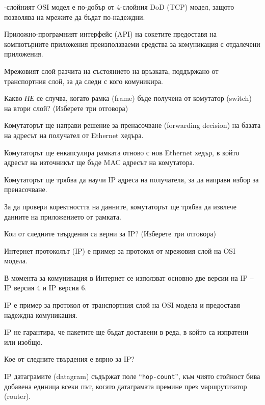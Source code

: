\begin{questions}
\begin{choices}
    -слойният OSI модел е по-добър от 4-слойния
    \foreignlanguage{english}{DoD} (TCP) модел, защото позволява на мрежите да
    бъдат по-надеждни.

    \CorrectChoice Приложно-програмният интерфейс (API) на сокетите предоставя на
    компютърните приложения преизползваеми средства за комуникация с отдалечени
    приложения.

    \choice Мрежовият слой разчита на състоянието на връзката, поддържано от
    транспортния слой, за да следи с кого комуникира.
  \end{choices}\question[6] Какво \emph{НЕ} се случва, когато рамка
  (\foreignlanguage{english}{frame}) бъде получена от комутатор
  (\foreignlanguage{english}{switch}) на втори слой? (Изберете три отговора)

  \begin{choices}
    \choice Комутаторът ще направи решение за пренасочване
    (\foreignlanguage{english}{forwarding decision}) на базата на адресът на
    получател от \foreignlanguage{english}{Ethernet} хедъра.

    \CorrectChoice Комутаторът ще енкапсулира рамката отново с нов Ethernet хедър,
    в който адресът на източникът ще бъде MAC адресът на комутатора.

    \CorrectChoice Комутаторът ще трябва да научи IP адреса на получателя, за да
    направи избор за пренасочване.

    \CorrectChoice За да провери коректността на данните, комутаторът ще трябва
    да извлече данните на приложението от рамката.
  \end{choices}

  \question[6] Кои от следните твърдения са верни за IP? (Изберете три отговора)
  \begin{choices}
    \CorrectChoice Интернет протоколът (IP) е пример за протокол от мрежовия
    слой на OSI модела.

    \CorrectChoice В момента за комуникация в Интернет се използват основно две
    версии на IP – IP версия 4 и IP версия 6.

    \choice IP е пример за протокол от транспортния слой на OSI модела и
    предоставя надеждна комуникация.

    \CorrectChoice IP не гарантира, че пакетите ще бъдат доставени в реда, в
    който са изпратени или изобщо.
  \end{choices}

  \question[6] Кое от следните твърдения е вярно за IP?
  \begin{choices}
    \choice IP датаграмите (\foreignlanguage{english}{datagram}) съдържат поле
    "`\texttt{\foreignlanguage{english}{hop-count}}"', към чиято стойност бива
    добавена единица всеки път, когато датаграмата премине през маршрутизатор
    (\foreignlanguage{english}{router}).


\end{choices}
\end{questions}
